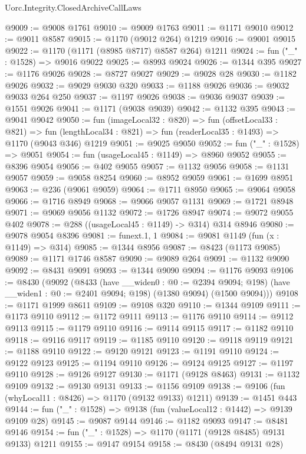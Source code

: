 \begin{lexlean}{Uorc.Integrity.ClosedArchiveCallLaws}
\begin{coremodule}
@9009 := @9008 @1761
@9010 := @9009 @1763
@9011 := @1171 @9010
@9012 := @9011 @8587
@9015 := @1170 (@9012 @264) @1219
@9016 := @9001 @9015
@9022 := @1170 (@1171 (@8985 @8717) @8587 @264) @1211
@9024 := fun ("_" : @1528) => @9016 @9022
@9025 := @8993 @9024
@9026 := @1344 @395
@9027 := @1176 @9026
@9028 := @8727 @9027
@9029 := @9028 @28
@9030 := @1182 @9026
@9032 := @9029 @9030 @320
@9033 := @1188 @9026
@9036 := @9032 @9033 @264 @250
@9037 := @1197 @9026
@9038 := @9036 @9037
@9039 := @1551 @9026
@9041 := @1171 (@9038 @9039)
@9042 := @1132 @395
@9043 := @9041 @9042
@9050 := fun (imageLocal32 : @820) =>
  fun (offsetLocal33 : @821) =>
  fun (lengthLocal34 : @821) => fun (readerLocal35 : @1493) => @1170 (@9043 @346) @1219
@9051 := @9025 @9050
@9052 := fun ("_" : @1528) => @9051
@9054 := fun (usageLocal45 : @1149) => @8960 @9052
@9055 := @8396 @9054
@9056 := @402 @9055
@9057 := @1132 @9056
@9058 := @1131 @9057
@9059 := @9058 @8254
@9060 := @8952 @9059
@9061 := @1699 @8951
@9063 := @236 (@9061 @9059)
@9064 := @1711 @8950
@9065 := @9064 @9058
@9066 := @1716 @8949
@9068 := @9066 @9057 @1131
@9069 := @1721 @8948
@9071 := @9069 @9056 @1132
@9072 := @1726 @8947
@9074 := @9072 @9055 @402
@9078 := @288 ((usageLocal45 : @1149) -> @314) @314 @8946
@9080 := @9078 @9054 @8396
@9081 := funext.{1, 1}
@9084 := @9081 @1149 (fun (x : @1149) => @314)
@9085 := @1344 @8956
@9087 := @8423 (@1173 @9085)
@9089 := @1171 @1746 @8587
@9090 := @9089 @264
@9091 := @1132 @9090
@9092 := @8431 @9091
@9093 := @1344 @9090
@9094 := @1176 @9093
@9106 := @8430
    (@9092
      (@8433
        (have __widen0 : @0 := @2394 @9094; @198)
        (have __widen1 : @0 := @2401 @9094; @198)
        (@1380 @9094)
        (@1500 @9094)))
@9108 := @1171 @1999 @8611
@9109 := @9108 @320
@9110 := @1344 @9109
@9111 := @1173 @9110
@9112 := @1172 @9111
@9113 := @1176 @9110
@9114 := @9112 @9113
@9115 := @1179 @9110
@9116 := @9114 @9115
@9117 := @1182 @9110
@9118 := @9116 @9117
@9119 := @1185 @9110
@9120 := @9118 @9119
@9121 := @1188 @9110
@9122 := @9120 @9121
@9123 := @1191 @9110
@9124 := @9122 @9123
@9125 := @1194 @9110
@9126 := @9124 @9125
@9127 := @1197 @9110
@9128 := @9126 @9127
@9130 := @1171 (@9128 @8463)
@9131 := @1132 @9109
@9132 := @9130 @9131
@9133 := @1156 @9109
@9138 := @9106 (fun (whyLocal11 : @8426) => @1170 (@9132 @9133) @1211)
@9139 := @1451 @443
@9144 := fun ("_" : @1528) => @9138 (fun (valueLocal12 : @1442) => @9139 @9109 @28)
@9145 := @9087 @9144
@9146 := @1182 @9093
@9147 := @8481 @9146
@9154 := fun ("_" : @1528) => @1170 (@1171 (@9128 @8485) @9131 @9133) @1211
@9155 := @9147 @9154
@9158 := @8430 (@8494 @9131 @28)

\end{coremodule}
\end{lexlean}
